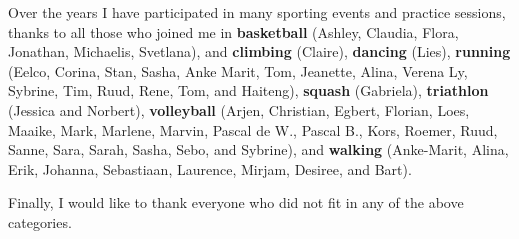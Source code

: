 Over the years I have participated in many sporting events and practice sessions, thanks to all those who joined me in 
\textbf{basketball} (Ashley, Claudia, Flora, Jonathan, Michaelis, Svetlana), and 
\textbf{climbing} (Claire), 
\textbf{dancing} (Lies),
\textbf{running} (Eelco, Corina, Stan, Sasha, Anke Marit, Tom, Jeanette, Alina, Verena Ly, Sybrine, Tim, Ruud, Rene, Tom, and Haiteng),
\textbf{squash} (Gabriela),
\textbf{triathlon} (Jessica and Norbert), 
\textbf{volleyball} (Arjen, Christian, Egbert, Florian, Loes, Maaike, Mark, Marlene, Marvin, Pascal de W., Pascal B., Kors, Roemer, Ruud, Sanne, Sara, Sarah, Sasha, Sebo, and Sybrine), 
and 
\textbf{walking} (Anke-Marit, Alina, Erik, Johanna, Sebastiaan, Laurence, Mirjam, Desiree, and Bart).

Finally, I would like to thank everyone who did not fit in any of the above categories.
